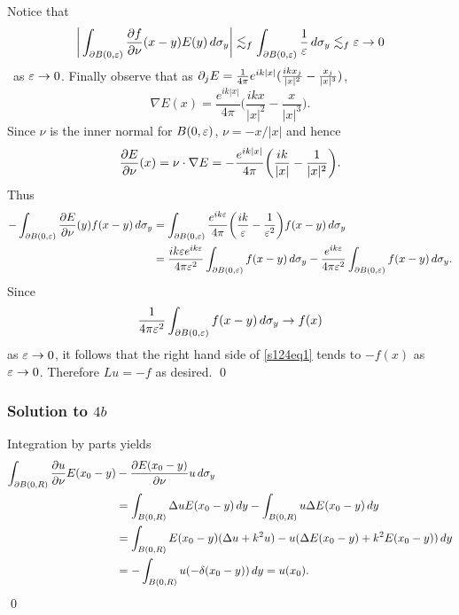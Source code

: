 Notice that
\begin{align*}
\bigg| \int_{\partial B(0, \varepsilon)}\frac{\partial f}{\partial \nu}(x - y)E(y)\, d\sigma_{y} \bigg| \lesssim_{f} \int_{\partial B(0, \varepsilon)}\frac{1}{\varepsilon}\, d\sigma_{y} \lesssim_{f} \varepsilon \rightarrow 0
\end{align*}\
as $\varepsilon \rightarrow 0$. Finally observe that as $\partial_{j}E = \frac{1}{4\pi}e^{ik|x|}(\frac{ikx_{j}}{|x|^{2}} - \frac{x_{j}}{|x|^{3}})$,
$$\nabla E(x) = \frac{e^{ik|x|}}{4\pi}\bigg(\frac{ikx}{|x|^{2}} - \frac{x}{|x|^{3}}\bigg).$$
Since $\nu$ is the inner normal for $B(0, \varepsilon)$, $\nu = -x/|x|$ and hence
$$\frac{\partial E}{\partial \nu}(x) = \nu \cdot \nabla E = -\frac{e^{ik|x|}}{4\pi}\bigg(\frac{ik}{|x|} - \frac{1}{|x|^{2}}\bigg).$$
Thus
\begin{equation}
\begin{aligned}\label{s124eq1}
-\int_{\partial B(0, \varepsilon)}\frac{\partial E}{\partial \nu}(y)f(x - y)\, d\sigma_{y}&= \int_{\partial B(0, \varepsilon)}\frac{e^{ik\varepsilon}}{4\pi}\bigg(\frac{ik}{\varepsilon} - \frac{1}{\varepsilon^{2}}\bigg)f(x -y)\, d\sigma_{y}\\&= \frac{ik\varepsilon e^{ik\varepsilon}}{4\pi \varepsilon^{2}}\int_{\partial B(0, \varepsilon)}f(x - y)\, d\sigma_{y} - \frac{e^{ik\varepsilon}}{4\pi \varepsilon^{2}}\int_{\partial B(0, \varepsilon)}f(x - y)\, d\sigma_{y}.
\end{aligned}
\end{equation}
Since
$$\frac{1}{4\pi\varepsilon^{2}}\int_{\partial B(0, \varepsilon)}f(x - y)\, d\sigma_{y} \rightarrow f(x)$$
as $\varepsilon \rightarrow 0$, it follows that the right hand side of \eqref{s124eq1} tends to $-f(x)$ as $\varepsilon \rightarrow 0$. Therefore $Lu = -f$ as desired.
\hfill\qed

\subsubsection*{Solution to $4b$}
Integration by parts yields
\begin{align*}
\int_{\partial B(0, R)}\frac{\partial u}{\partial \nu}E(x_{0} - y) &- \frac{\partial E(x_{0} -y)}{\partial \nu}u\, d\sigma_{y}\\
&= \int_{B(0, R)}\Delta u E(x_{0} - y)\, dy - \int_{B(0, R)}u\Delta E(x_{0} - y)\, dy\\
&= \int_{B(0, R)}E(x_{0} - y)(\Delta u + k^{2}u) - u(\Delta E(x_{0} - y) + k^{2}E(x_{0} - y))\, dy\\
&= -\int_{B(0, R)}u(-\delta (x_{0} - y))\, dy = u(x_{0}).
\end{align*}
\hfill\qed

